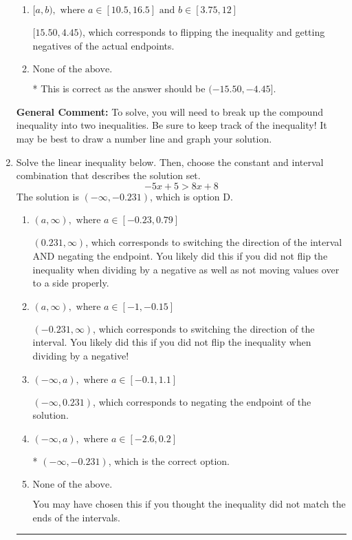 \documentclass{extbook}[14pt]
\newcommand{\litem}[1]{\item #1

\rule{\textwidth}{0.4pt}}
\begin{document}
\begin{enumerate}
{\begin{enumerate}[label=\Alph*.]
$(-\infty, 15.50] \cup (4.45, \infty)$, which corresponds to displaying the and-inequality as an or-inequality AND flipping the inequality AND getting negatives of the actual endpoints.
\item \( [a, b), \text{ where } a \in [10.5, 16.5] \text{ and } b \in [3.75, 12] \)

$[15.50, 4.45)$, which corresponds to flipping the inequality and getting negatives of the actual endpoints.
\item \( \text{None of the above.} \)

* This is correct as the answer should be $(-15.50, -4.45]$.
\end{enumerate}

\textbf{General Comment:} To solve, you will need to break up the compound inequality into two inequalities. Be sure to keep track of the inequality! It may be best to draw a number line and graph your solution.
}
\litem{
Solve the linear inequality below. Then, choose the constant and interval combination that describes the solution set.
\[ -5x + 5 > 8x + 8 \]The solution is \( (-\infty, -0.231) \), which is option D.\begin{enumerate}[label=\Alph*.]
\item \( (a, \infty), \text{ where } a \in [-0.23, 0.79] \)

 $(0.231, \infty)$, which corresponds to switching the direction of the interval AND negating the endpoint. You likely did this if you did not flip the inequality when dividing by a negative as well as not moving values over to a side properly.
\item \( (a, \infty), \text{ where } a \in [-1, -0.15] \)

 $(-0.231, \infty)$, which corresponds to switching the direction of the interval. You likely did this if you did not flip the inequality when dividing by a negative!
\item \( (-\infty, a), \text{ where } a \in [-0.1, 1.1] \)

 $(-\infty, 0.231)$, which corresponds to negating the endpoint of the solution.
\item \( (-\infty, a), \text{ where } a \in [-2.6, 0.2] \)

* $(-\infty, -0.231)$, which is the correct option.
\item \( \text{None of the above}. \)

You may have chosen this if you thought the inequality did not match the ends of the intervals.
\end{enumerate}

}
\end{enumerate}
\end{document}
